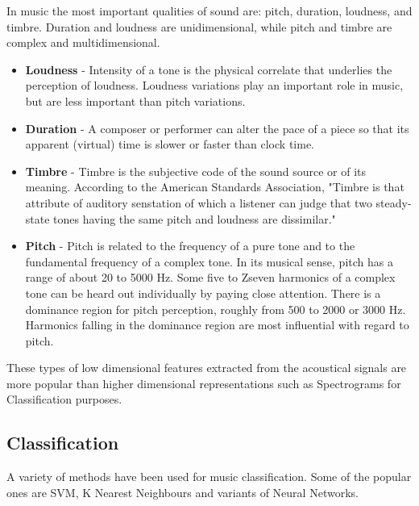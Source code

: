 In music the most important qualities of sound are: pitch, duration, loudness, and timbre. Duration and loudness are unidimensional, while pitch and timbre are complex and multidimensional. \cite{dooling2014}

\begin{itemize}
        \item \textbf{Loudness} - Intensity of a tone is the physical correlate that underlies the perception of loudness. Loudness variations play an important role in music, but are less important than pitch variations.

        \item \textbf{Duration} - A composer or performer can alter the pace of a piece so that its apparent (virtual) time is slower or faster than clock time. 

        \item \textbf{Timbre} - Timbre is the subjective code of the sound source or of its meaning. According to the American Standards Association, "Timbre
                is that attribute of auditory senstation of which a listener can judge that two steady-state tones having the same pitch and loudness are dissimilar."

        \item \textbf{Pitch} - Pitch is related to the frequency of a pure tone and to the fundamental frequency of a complex tone. In its musical sense, pitch
                has a range of about 20 to 5000 Hz. Some five to Zseven harmonics of a complex tone can be heard out individually by paying close attention. There
                is a dominance region for pitch perception, roughly from 500 to 2000 or 3000 Hz. Harmonics falling in the dominance region are most influential 
                with regard to pitch.

\end{itemize}

These types of low dimensional features extracted from the acoustical signals are more popular than higher dimensional representations such as
Spectrograms for Classification purposes. \cite{prasad2007}

\subsection{Classification}

A variety of methods have been used for music classification. Some of the popular ones are SVM, K Nearest Neighbours and variants of Neural Networks.

